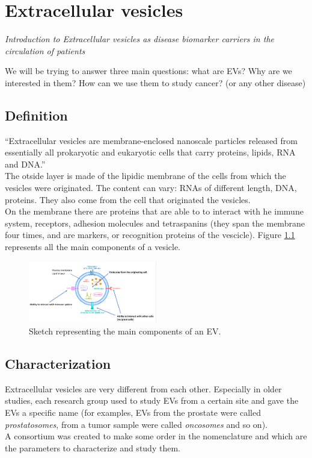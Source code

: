 \graphicspath{{chapters/ev/}}
\chapter{Extracellular vesicles}
\emph{Introduction to Extracellular vesicles as disease biomarker carriers in the circulation of patients}

We will be trying to answer three main questions: what are EVs? Why are we interested in them? How can we use them to study cancer? (or any other disease)

\section{Definition}
“Extracellular vesicles are membrane-enclosed nanoscale particles released from essentially all prokaryotic and eukaryotic cells that carry proteins, lipids, RNA and DNA.”
\\
The otside layer is made of the lipidic membrane of the cells from which the vesicles were originated. 
The content can vary: RNAs of different length, DNA, proteins. They also come from the cell that originated the vesicles.\\
On the membrane there are proteins that are able to to interact with he immune system, receptors, adhesion molecules and tetraspanins (they span the membrane four times, and are markers, or recognition proteins of the vescicle).
Figure \ref{fig:ev1} represents all the main components of a vesicle.
\begin{figure}[H]
    \centering
    \includegraphics[width=0.5\textwidth]{ev1.png}
    \caption{Sketch representing the main components of an EV.}
    \label{fig:ev1}
\end{figure}

\section{Characterization}
Extracellular vesicles are very different from each other. 
Especially in older studies, each research group used to study EVs from a certain site and gave the EVs a specific name (for examples, EVs from the prostate were called \textit{prostatosomes}, from a tumor sample were called \textit{oncosomes} and so on).
\\
A consortium was created to make some order in the nomenclature and which are the parameters to characterize and study them.

